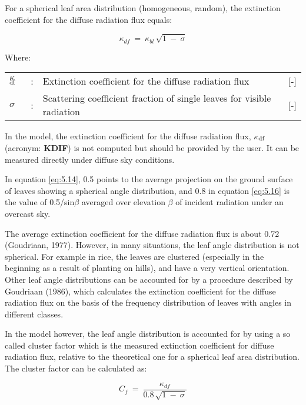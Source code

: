 For a spherical leaf area distribution (homogeneous, random), the extinction coefficient
for the diffuse radiation flux equals:

\begin{equation}
\label{eq:5.15}
 \kappa_{df} ~=~ \kappa_{bl} \, \sqrt{1~-~ \sigma }
\end{equation}

Where:\\[5pt]
\begin{tabularx}{\textwidth}{llXr}
$\kappa$$_{{\rm df}}$ &:& Extinction coefficient for the diffuse radiation flux    &    [-]\\
$\sigma$ &:& Scattering coefficient fraction of single leaves for 
   visible radiation    &    [-]\\
\end{tabularx}

In the model, the extinction coefficient for the diffuse radiation flux, 
{\bf $\kappa$$_{{\rm df}}$} (acronym: {\bf KDIF})
is not computed but should be provided by the user. It can be measured directly 
under diffuse sky conditions.

In equation \ref{eq:5.14}, 0.5 points to the average projection on the ground surface of leaves
showing a spherical angle distribution, and 0.8 in equation \ref{eq:5.16} is the value of 0.5/sin$\beta$
averaged over elevation $\beta$ of incident radiation under an overcast sky.

The average extinction coefficient for the diffuse radiation flux is about 0.72 (Goudriaan,
1977). However, in many situations, the leaf angle distribution is not spherical. For
example in rice, the leaves are clustered (especially in the beginning as a result of
planting on hills), and have a very vertical orientation. Other leaf angle distributions can
be accounted for by a procedure described by Goudriaan (1986), which calculates the
extinction coefficient for the diffuse radiation flux on the basis of the frequency 
distribution of leaves with angles in different classes.

In the model however, the leaf angle distribution is accounted for by using a so called
cluster factor which is the measured extinction coefficient for diffuse radiation flux,
relative to the theoretical one for a spherical leaf area distribution. The cluster factor can
be calculated as: 

\begin{equation}
\label{eq:5.16}
C _{f} ~=~{\frac{ \kappa _{df} }{0.8\, \sqrt{1 ~-~ \sigma } }}
\end{equation}

